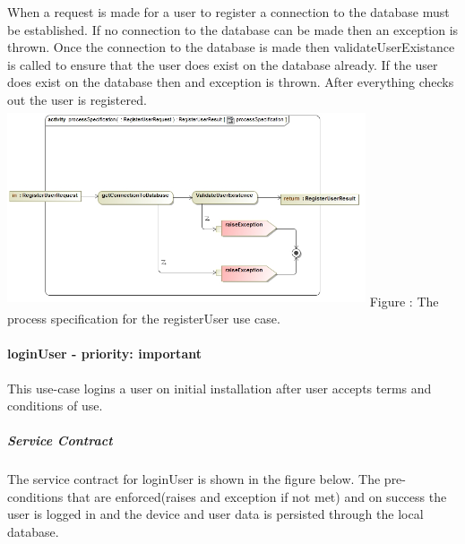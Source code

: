 \documentclass[hidelinks, 12pt, oneside]{article}
\begin{document}
		
		When a request is made for a user to register a connection to the database must be established. If no connection to the database can be made then an exception is thrown. Once the connection to the database is made then validateUserExistance is called to ensure that the user does exist on the database already. If the user does exist on the database then and exception is thrown. After everything checks out the user is registered.\newline\newline	
		\includegraphics[width=400px,height=220px]{img/processSpecificationRegisterUser.jpg}
		Figure : The process specification for the registerUser use case.		
	
	\paragraph{loginUser - priority: important}
		This use-case logins a user on initial installation after user accepts terms and conditions of use.
	\subparagraph{Service Contract}
		The service contract for loginUser is shown in the figure below. The pre-conditions that are enforced(raises and exception if not met) and on success the user is logged in and the device and user data is persisted through the local database.\newline 	
	
\end{document}

